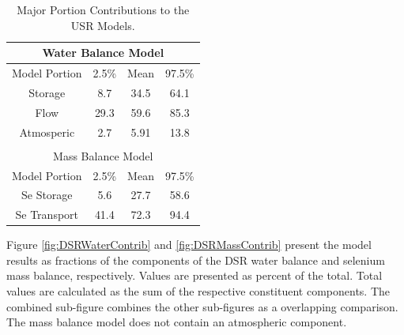 \begin{linenumbers}
\begin{table}[htbp]
\centering
\caption[Major Portion Contributions to the USR Models.]{Major Portion Contributions to the USR Models.}
\label{tab:USRImpact}
\begin{tabular}{c|ccc}
	\multicolumn{4}{c}{Water Balance Model} \\
	\toprule
	Model Portion	& 2.5\% & Mean & 97.5\% \\
	\midrule
	\midrule
	Storage		& 8.7	&34.5	&64.1\\
	Flow		& 29.3	&59.6	&85.3\\
	Atmosperic 	& 2.7	&5.91	&13.8\\
	\bottomrule
	\multicolumn{4}{c}{} \\
	\multicolumn{4}{c}{Mass Balance Model} \\
	\toprule
	Model Portion	& 2.5\% & Mean & 97.5\% \\
	\midrule
	\midrule
	Se Storage		& 5.6	&27.7	&58.6\\
	Se Transport	& 41.4	&72.3	&94.4  \\
	\bottomrule
\end{tabular}
\end{table}

Figure \ref{fig:DSRWaterContrib} and \ref{fig:DSRMassContrib} present the model results as fractions of the components of the DSR water balance and selenium mass balance, respectively.  Values are presented as percent of the total.  Total values are calculated as the sum of the respective constituent components.  The combined sub-figure combines the other sub-figures as a overlapping comparison.  The mass balance model does not contain an atmospheric component.


\end{linenumbers}
